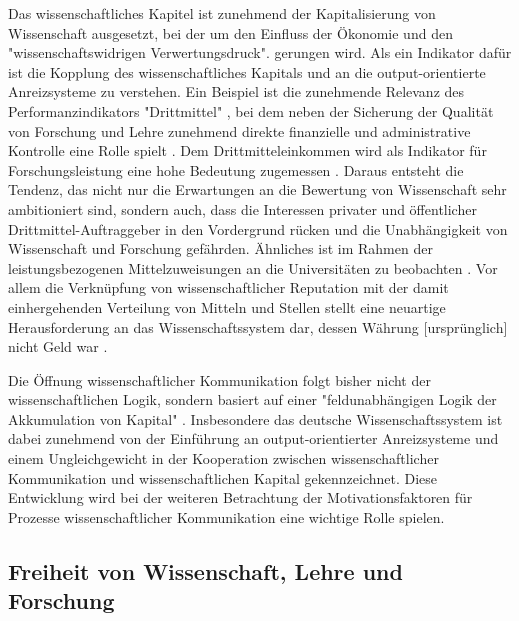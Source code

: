 Das wissenschaftliches Kapitel ist zunehmend der Kapitalisierung von Wissenschaft ausgesetzt, bei der um den Einfluss der Ökonomie und den "wissenschaftswidrigen Verwertungsdruck". \cite{suchen_Hornbostel_2006} gerungen wird. Als ein Indikator dafür ist die Kopplung des wissenschaftliches Kapitals und an die output-orientierte Anreizsysteme zu verstehen. Ein Beispiel ist die zunehmende Relevanz des Performanzindikators "Drittmittel" \cite{Fabrizio_2008} \cite{Jansen_2007}, bei dem neben der Sicherung der Qualität von Forschung und Lehre zunehmend direkte finanzielle und administrative Kontrolle eine Rolle spielt \cite{Barl_sius_2008}. Dem Drittmitteleinkommen wird als Indikator für Forschungsleistung eine hohe Bedeutung zugemessen \cite{Jansen_2007}. Daraus entsteht die Tendenz, das nicht nur die Erwartungen an die Bewertung von Wissenschaft sehr ambitioniert sind, sondern auch, dass die Interessen privater und öffentlicher Drittmittel-Auftraggeber in den Vordergrund rücken und die Unabhängigkeit von Wissenschaft und Forschung gefährden. Ähnliches ist im Rahmen der leistungsbezogenen Mittelzuweisungen an die Universitäten zu beobachten \cite{suchen_Hornbostel_2006}. Vor allem die Verknüpfung von wissenschaftlicher Reputation mit der damit einhergehenden Verteilung von Mitteln und Stellen stellt eine neuartige Herausforderung an das Wissenschaftssystem dar, dessen Währung [ursprünglich] nicht Geld war \cite{hanekop_2006} \cite{suchen_Hornbostel_2006}.

Die Öffnung wissenschaftlicher Kommunikation folgt bisher nicht der wissenschaftlichen Logik, sondern basiert auf einer "feldunabhängigen Logik der Akkumulation von Kapital" \cite{herb_2006}. Insbesondere das deutsche Wissenschaftssystem ist dabei zunehmend von der Einführung an output-orientierter Anreizsysteme \cite{osterloh2008anreize} und einem Ungleichgewicht in der Kooperation zwischen wissenschaftlicher Kommunikation und wissenschaftlichen Kapital gekennzeichnet. Diese Entwicklung wird bei der weiteren Betrachtung der Motivationsfaktoren für Prozesse wissenschaftlicher Kommunikation eine wichtige Rolle spielen.

\subsection{Freiheit von Wissenschaft, Lehre und Forschung}

